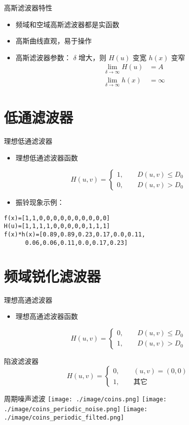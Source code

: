 \documentclass[presentation]{beamer}
\begin{document}
\begin{frame}[label={sec:org9b03e50}]{高斯滤波器特性}
\begin{itemize}
\item 频域和空域高斯滤波器都是实函数
\item 高斯曲线直观，易于操作
\item 高斯滤波器参数： \(\delta\) 增大，则 \(H(u)\) 变宽 \(h(x)\) 变窄
\begin{align*}
\lim_{\delta\to\infty} H(u) &=A \\
\lim_{\delta\to\infty} h(x) &=\infty
\end{align*}
\end{itemize}
\end{frame}

\section{低通滤波器}
\label{sec:org13359b2}

\begin{frame}[label={sec:org3755642},fragile]{理想低通滤波器}
 \begin{itemize}
\item 理想低通滤波器函数
\end{itemize}
\[ H(u,v) =\begin{cases} 1, \qquad D(u,v) \leq D_0 \\ 0, \qquad D(u,v) > D_0 \end{cases} \]
\begin{itemize}
\item 振铃现象示例：
\end{itemize}
\begin{verbatim}
f(x)=[1,1,0,0,0,0,0,0,0,0,0,0]
H(u)=[1,1,1,1,0,0,0,0,0,1,1,1]
f(x)*h(x)=[0.89,0.89,0.23,0.17,0.0,0.11,
      0.06,0.06,0.11,0.0,0.17,0.23]
\end{verbatim}
\end{frame}
\section{频域锐化滤波器}
\label{sec:org9154cbb}
\begin{frame}[label={sec:org6ff413a}]{理想高通滤波器}
\begin{itemize}
\item 理想高通滤波器函数
\end{itemize}
\[ H(u,v) = \begin{cases} 0, \qquad D(u,v)\leq D_0 \\    1, \qquad D(u,v) > D_0 \end{cases} \]
\end{frame}
\begin{frame}[label={sec:org8689479}]{陷波滤波器}
\[ H(u,v) = \begin{cases} 0, \qquad (u,v)=(0,0) \\    1, \qquad \text{其它} \end{cases} \]
\end{frame}

\begin{frame}[label={sec:org63e440d}]{周期噪声滤波}
\texttt{[image: ./image/coins.png]}
\texttt{[image: ./image/coins\_periodic\_noise.png]}
\texttt{[image: ./image/coins\_periodic\_filted.png]}
\end{frame}
\end{document}
